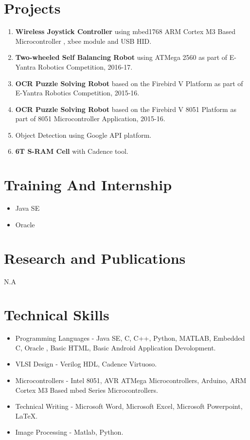 \documentclass[margin,line]{res}
\begin{document}
\begin{resume}
\section{\sc Projects}
\begin{enumerate}
	\item \textbf{Wireless Joystick Controller} using mbed1768 ARM Cortex M3 Based Microcontroller , xbee module and USB HID.
	\item \textbf{Two-wheeled Self Balancing Robot} using ATMega 2560 as part of E-Yantra Robotics Competition, 2016-17.
	\item \textbf{OCR Puzzle Solving Robot} based on the Firebird V Platform as part of E-Yantra Robotics Competition, 2015-16.
	\item \textbf{OCR Puzzle Solving Robot} based on the Firebird V 8051 Platform as part of 8051 Microcontroller Application, 2015-16.	
	\item Object Detection using Google API platform.
	\item \textbf{6T S-RAM Cell} with Cadence tool.		    
\end{enumerate}

\section{\sc Training And Internship}
\begin{itemize}
	\item Java SE
	\item Oracle
\end{itemize}

\section{\sc Research and Publications}
N.A\\

\section{\sc Technical Skills}
\begin{itemize}
	\item Programming Languages - Java SE, C, C++, Python, MATLAB, Embedded C, Oracle , Basic HTML, Basic Android Application Devolopment.
	\item VLSI Design - Verilog HDL, Cadence Virtuoso.
	\item Microcontrollers - Intel 8051, AVR ATMega Microcontrollers, Arduino, ARM Cortex M3 Based mbed Series Microcontrollers.
	\item Technical Writing - Microsoft Word, Microsoft Excel, Microsoft Powerpoint, LaTeX.
	\item Image Processing - Matlab, Python.
\end{itemize}

\end{resume}
\end{document}
